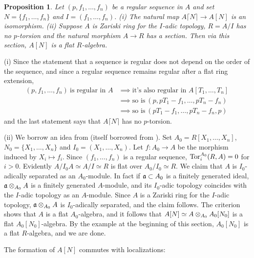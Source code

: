 \documentclass{article}
\theoremstyle{change}
\newtheorem{prop}[subsubsection]{Proposition}
\numberwithin{equation}{subsubsection}
\newcommand{\demobox}{\vrule height6pt width6pt depth0pt}
\newenvironment{demo}{\noindent{\it Proof.}}
{{\unskip\nobreak\hfil\qquad
\demobox\parfillskip=0pt\par}
\medskip}
\newcommand\lc{\lceil}
\newcommand\rc{\rceil}
\begin{document}
\begin{prop}\label{prop:regular-tubes}
  Let $(p,f_1,\ldots,f_n)$ be a regular sequence in $A$ and set
  $N=\{f_1,\ldots,f_n\}$ and $I=(f_1,\ldots,f_n)$. (i) The natural map
  $A\lc N\rc\to A[N]$ is an isomorphism. (ii) Suppose $A$ is Zariski
  ring for the $I$-adic topology, $R=A/I$ has no $p$-torsion and the
  natural morphism $A\to R$ has a section. Then via this section,
  $A[N]$ is a flat $R$-algebra.
\end{prop}
\begin{demo}
  (i) Since the statement that a sequence is regular does not depend on
  the order of the sequence, and since a regular sequence remains
  regular after a flat ring extension,
  \begin{align*}
    (p,f_1,\ldots,f_n)\ \text{is regular in $A$}
    &\implies\text{it's also regular in $A[T_1,\ldots,T_n]$}\\
    &\implies\text{so is}\ (p,pT_1-f_1,\ldots,pT_n-f_n)\\
    &\implies\text{so is}\ (pT_1-f_1,\ldots,pT_n-f_n,p)
  \end{align*}
  and the last statement says that $A\lc N\rc$ has no $p$-torsion.

  (ii) We borrow an idea from \cite[1.5.3]{berthelot:1996} (itself
  borrowed from \cite[2.3.3--4]{bbm:1982}). Set
  $A_0=R[X_1,\ldots,X_n]$, $N_0=\{X_1,\ldots,X_n\}$ and
  $I_0=(X_1,\ldots,X_n)$. Let $f:A_0\to A$ be the morphism induced by
  $X_i\mapsto f_i$. Since $(f_1,\ldots,f_n)$ is a regular sequence,
  ${\operatorname{Tor}}^{A_0}_i(R,A)=0$ for $i>0$. Evidently
  $A/I_0A\simeq A/I\simeq R$ is flat over $A_0/I_0\simeq R$. We claim
  that $A$ is $I_0$-adically separated as an $A_0$-module. In fact if
  ${\mathfrak a}\subset A_0$ is a finitely generated ideal, ${\mathfrak a}\otimes_{A_0}A$ is
  a finitely generated $A$-module, and its $I_0$-adic topology
  coincides with the $I$-adic topology as an $A$-module. Since $A$ is
  a Zariski ring for the $I$-adic topology, ${\mathfrak a}\otimes_{A_0}A$ is
  $I_0$-adically separated, and the claim follows. The criterion
  \cite[Ch. III \S5 no. 1 Th. 1]{bourbaki-AC} shows that $A$ is a flat
  $A_0$-algebra, and it follows that $A[N]\simeq A\otimes_{A_0}A_0[N_0]$
  is a flat $A_0[N_0]$-algebra. By the example at the beginning of
  this section, $A_0[N_0]$ is a flat $R$-algebra, and we are done.
\end{demo}

The formation of $A[N]$ commutes with localizations:
\end{document}
